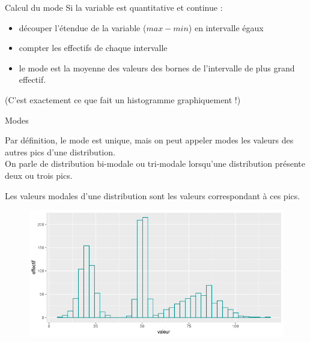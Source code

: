 \documentclass{beamer}
\begin{document}
\begin{frame}{Calcul du mode}
Si la variable est quantitative et continue : 
\begin{itemize}
  \item découper l’étendue de la variable ($max -min$) en intervalle égaux
  \item compter les effectifs de chaque intervalle
  \item le mode est la moyenne des valeurs des bornes de l'intervalle de plus grand effectif.
\end{itemize}

\begin{tiny}
(C’est exactement ce que fait un histogramme graphiquement !)
\end{tiny}

\end{frame}



\begin{frame}{Modes}

Par définition, le mode est unique, mais on peut appeler modes les valeurs des autres pics d’une distribution.\\

 On parle de distribution \alert{bi-modale} ou \alert{tri-modale} lorsqu’une distribution présente deux ou trois pics. 

 Les \alert{valeurs modales} d’une distribution sont les valeurs correspondant à ces pics. 



\begin{figure}
  \centering
     \includegraphics[width=.7\linewidth]{img/trimodale.png}
\end{figure}

\end{frame}
\end{document}
